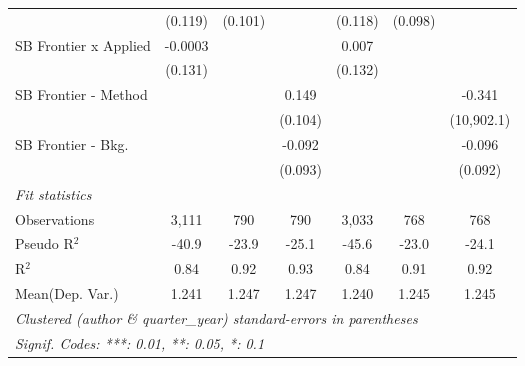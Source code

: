 \begin{tabular}{lcccccc}
                                & (0.119)       & (0.101)      &               & (0.118)       & (0.098)      &   \\   
   SB Frontier x Applied        & -0.0003       &              &               & 0.007         &              &   \\   
                                & (0.131)       &              &               & (0.132)       &              &   \\   
   SB Frontier - Method         &               &              & 0.149         &               &              & -0.341\\   
                                &               &              & (0.104)       &               &              & (10,902.1)\\   
   SB Frontier - Bkg.           &               &              & -0.092        &               &              & -0.096\\   
                                &               &              & (0.093)       &               &              & (0.092)\\   
   \midrule
   \emph{Fit statistics}\\
   Observations                 & 3,111         & 790          & 790           & 3,033         & 768          & 768\\  
   Pseudo R$^2$                 & -40.9         & -23.9        & -25.1         & -45.6         & -23.0        & -24.1\\  
   R$^2$                        & 0.84          & 0.92         & 0.93          & 0.84          & 0.91         & 0.92\\  
Mean(Dep. Var.) & 1.241 & 1.247 & 1.247 & 1.240 & 1.245 & 1.245 \\
   \midrule \midrule
   \multicolumn{7}{l}{\emph{Clustered (author \& quarter\_year) standard-errors in parentheses}}\\
   \multicolumn{7}{l}{\emph{Signif. Codes: ***: 0.01, **: 0.05, *: 0.1}}\\
\end{tabular}
\par\endgroup
